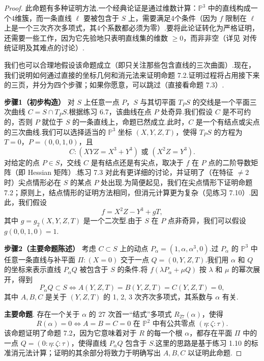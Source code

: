\begin{proof}
此命题有多种证明方法.一个经典论证是通过维数计算：\({\mathbb{P}}^{3}\) 中的直线构成一个4维簇，而一条直线 \(\ell\) 要被包含于 \(S\) 上，需要满足4个条件（因为 \(f\) 限制在 \(\ell\) 上是一个三次齐次多项式，其4个系数都必须为零）.要将此论证转化为严格证明，还需要一些工作，因为它先验地只表明直线集的维数 \(\ge 0\)，而非非空（详见 \cite[8.15]{MilesReid_UndergraduateAlgebraicGeometry} 对传统证明及其难点的讨论）.

我们也可以合理地假设该命题成立（即只关注那些包含直线的三次曲面）.现在，我们说明如何通过直接的坐标几何和消元法来证明命题 7.2.证明过程将占用接下来的三页，并分为四个步骤；如果你愿意，可以跳过（直接看命题 7.3）.

\textbf{步骤1（初步构造）} 对 \(S\) 上任意一点 \(P\)，\(S\) 与其切平面 \(T_PS\) 的交线是一个平面三次曲线 \(C = S \cap T_PS\).根据练习 6.7，该曲线在点 \(P\) 处奇异.我们假设 \(C\) 是不可约的，否则 \(P\) 就位于 \(S\) 的一条直线上，命题已然成立.此时，\(C\) 是一个有结点或尖点的三次曲线.我们可以选择适当的 \({\mathbb{P}}^{3}\) 坐标 \((X, Y, Z, T)\)，使得 \(T_PS\) 的方程为 \(T=0\)，\(P = (0,0,1,0)\)，且
\[
C: (XYZ = X^3 + Y^3) \text{ 或 } (X^2Z = Y^3).
\]
对给定的点 \(P \in S\)，交线 \(C\) 是有结点还是有尖点，取决于 \(f\) 在 \(P\) 点的二阶导数矩阵（即 Hessian 矩阵）.练习 7.3 对此有更详细的讨论，并证明了（在特征 \(\neq 2\) 时）尖点情形必在 \(S\) 的某点 \(P\) 处出现.为简便起见，我们在尖点情形下证明命题 7.2；原则上，结点情形的证明方法相同，但消元计算更为复杂（见练习 7.10）.因此，我们假设
\[
f = X^2Z - Y^3 + gT,
\]
其中 \(g = g_2(X,Y,Z,T)\) 是一个二次型.由于 \(S\) 在 \(P\) 点非奇异，我们可以假设 \(g(0,0,1,0) = 1\).

\textbf{步骤2（主要命题陈述）} 考虑 \(C \subset S\) 上的动点 \(P_\alpha = (1, \alpha, \alpha^3, 0)\).过 \(P_\alpha\) 的 \({\mathbb{P}}^{3}\) 中任意一条直线与补平面 \(\Pi: (X=0)\) 交于一点 \(Q = (0,Y,Z,T)\).我们用 \(\alpha\) 和 \(Q\) 的坐标来表示直线 \(P_\alpha Q\) 被包含于 \(S\) 的条件.将 \(f(\lambda P_\alpha + \mu Q)\) 按 \(\lambda\) 和 \(\mu\) 的幂次展开，得到
\[
P_\alpha Q \subset S \iff A(Y,Z,T) = B(Y,Z,T) = C(Y,Z,T) = 0,
\]
其中 \(A, B, C\) 是关于 \((Y, Z, T)\) 的 1, 2, 3 次齐次多项式，其系数与 \(\alpha\) 有关.

\textbf{主要命题}. 存在一个关于 \(\alpha\) 的 27 次首一“结式”多项式 \(R_{27}(\alpha)\)，使得
\[
R(\alpha) = 0 \iff A=B=C=0 \text{ 在 } {\mathbb{P}}^{2} \text{ 中有公共零点 } (\eta:\zeta:\tau).
\]
该命题证明了命题 7.2，因为它意味着对于 \(R\) 的每一个根 \(\alpha\)，都存在平面 \(\Pi\) 中的一点 \(Q = (0:\eta:\zeta:\tau)\)，使得直线 \(P_\alpha Q\) 包含于 \(S\).这里的思路是基于练习 1.10 的标准消元法计算；证明的其余部分将致力于明确写出 \(A, B, C\) 以证明此命题.


\end{proof}
